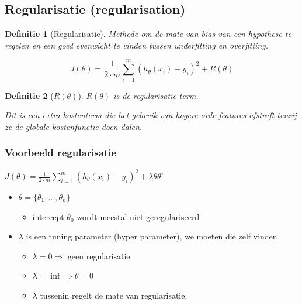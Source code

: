 \documentclass{article}
\newtheorem{theorem}{Definitie}[section]
\begin{document}
\subsection{Regularisatie (regularisation)}

\begin{theorem}[Regularisatie]
Methode om de mate van bias van een hypothese te regelen en een 
goed evenwicht te vinden tussen underfitting en overfitting.

\begin{equation}
J(\theta) = \frac{1}{2\cdot m} \sum_{i=1}^m (h_{\theta}(x_i) - y_i)^2 + R(\theta)
\end{equation}


\end{theorem}

\begin{theorem}[$R(\theta)$]
$R(\theta)$ is de regularisatie-term. 

Dit is een extra kostenterm die het gebruik van hogere orde features afstraft
tenzij ze de globale kostenfunctie doen dalen.
\end{theorem}

\subsubsection{Voorbeeld regularisatie}

\begin{center}
    $J(\theta) = \frac{1}{2\cdot m} \sum_{i=1}^m (h_{\theta}(x_i) - y_i)^2 + \lambda \theta \theta^{\tau}$
\end{center}

\begin{itemize}
    \item $\theta = \{\theta_1, \dots, \theta_n\}$
    \begin{itemize}
        \item intercept $\theta_0$ wordt meestal niet geregulariseerd
    \end{itemize}
    \item $\lambda$ is een tuning parameter (hyper parameter), we moeten die zelf vinden
    \begin{itemize}
        \item $\lambda = 0 \Rightarrow$ geen regularisatie
        \item $\lambda = \inf \Rightarrow \theta = 0$ 
        \item $\lambda$ tussenin regelt de mate van regularisatie.
    \end{itemize}
\end{itemize}
\end{document}
